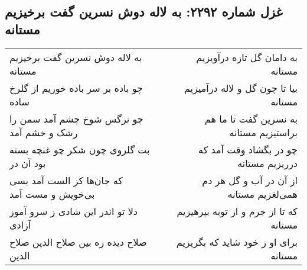 \begin{center}
\section*{غزل شماره ۲۲۹۲: به لاله دوش نسرین گفت برخیزیم مستانه}
\label{sec:2292}
\begin{longtable}{l p{0.5cm} r}
به لاله دوش نسرین گفت برخیزیم مستانه
&&
به دامان گل تازه درآویزیم مستانه
\\
چو باده بر سر باده خوریم از گلرخ ساده
&&
بیا تا چون گل و لاله درآمیزیم مستانه
\\
چو نرگس شوخ چشم آمد سمن را رشک و خشم آمد
&&
به نسرین گفت تا ما هم براستیزیم مستانه
\\
بت گلروی چون شکر چو غنچه بسته بود آن در
&&
چو در بگشاد وقت آمد که درریزیم مستانه
\\
که جان‌ها کز الست آمد بسی بی‌خویش و مست آمد
&&
از آن در آب و گل هر دم همی‌لغزیم مستانه
\\
دلا تو اندر این شادی ز سرو آموز آزادی
&&
که تا از جرم و از توبه بپرهیزیم مستانه
\\
صلاح دیده ره بین صلاح الدین صلاح الدین
&&
برای او ز خود شاید که بگریزیم مستانه
\\
\end{longtable}
\end{center}
